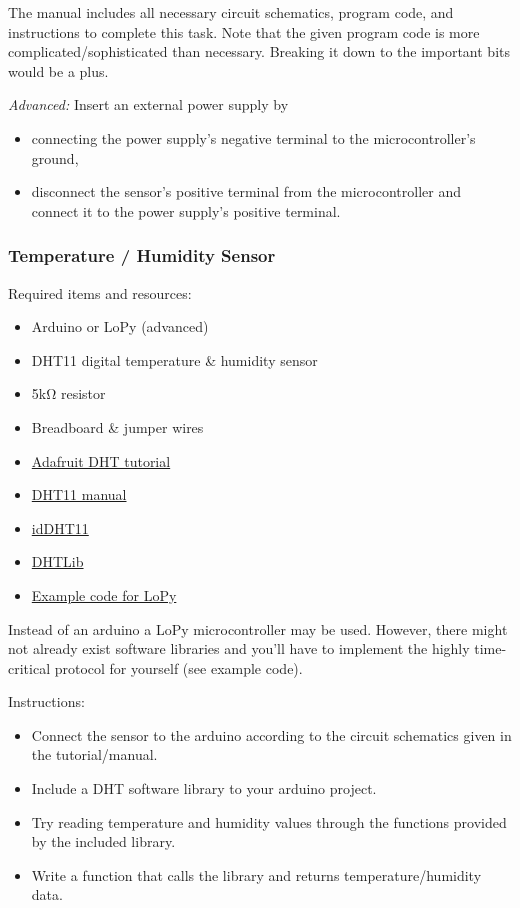 \documentclass[a4paper]{article}
\begin{document}
The manual includes all necessary circuit schematics, program code, and instructions to complete this task.
Note that the given program code is more complicated/sophisticated than necessary.
Breaking it down to the important bits would be a plus.

\textit{Advanced:} Insert an external power supply by
\begin{itemize}
 \item connecting the power supply's negative terminal to the microcontroller's ground,
 \item disconnect the sensor's positive terminal from the microcontroller and connect it to the power supply's positive terminal.
\end{itemize}


\subsubsection{Temperature / Humidity Sensor}

Required items and resources:
\begin{itemize}
 \item Arduino or LoPy (advanced)
 \item DHT11 digital temperature \& humidity sensor
 \item 5k\si{\ohm} resistor
 \item Breadboard \& jumper wires
 \item \href{https://learn.adafruit.com/dht}{Adafruit DHT tutorial}
 \item \href{http://www.micro4you.com/files/sensor/DHT11.pdf}{DHT11 manual}
 \item \href{https://github.com/niesteszeck/idDHT11}{idDHT11}
 \item \href{http://playground.arduino.cc/Main/DHTLib}{DHTLib}
 \item \href{https://github.com/johnmcdnz/LoPy-DHT-transmission}{Example code for LoPy}
\end{itemize}

Instead of an arduino a LoPy microcontroller may be used. However, there might not already exist
software libraries and you'll have to implement the highly time-critical protocol for yourself
(see example code).

Instructions:
\begin{itemize}
 \item Connect the sensor to the arduino according to the circuit schematics given in the tutorial/manual.
 \item Include a DHT software library to your arduino project.
 \item Try reading temperature and humidity values through the functions provided by the included library.
 \item Write a function that calls the library and returns temperature/humidity data.
\end{itemize}
\end{document}
